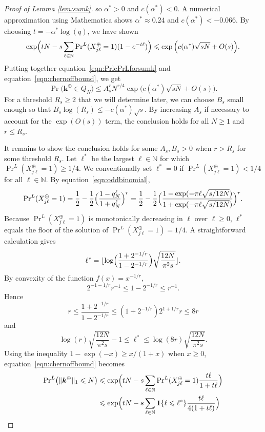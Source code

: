 \documentclass[10pt,a4paper]{amsart}
\newcommand{\bsk}{\boldsymbol{k}}
\newcommand{\bsone}{\boldsymbol{1}}
\renewcommand{\geq}{\geqslant}
\renewcommand{\leq}{\leqslant}
\newcommand{\natu}{\mathbb{N}}
\begin{document}
\begin{proof}[Proof of Lemma \ref{lem:sumk}]
     so $\alpha^*>0$ and $c(\alpha^*)<0$. A numerical approximation using Mathematica shows $\alpha^*\approx 0.24$ and $c(\alpha^*)< -0.066$.
By choosing $t=-\alpha^*\log(q)$, we have shown
    $$\exp\Bigl(tN-s\sum_{\ell\in\natu}{\textstyle\Pr}^L(X^\oplus_{j\ell}=1)(1-e^{-t\ell })\Bigr)\leq \exp\Big(c(\alpha^*)\sqrt{sN}+O(s)\Big).$$
    Putting together equation~\eqref{eqn:PrlePrLforsumk} and equation~\eqref{eqn:chernoffbound}, we get
    $$\Pr\big(\bsk^\oplus\in Q_N\big)\leq A^r_sN^{r/4}\exp\Big(c(\alpha^*)\sqrt{sN}+O(s)\Big).$$
    For a threshold $R_s\geq 2$ that we will determine later, we can choose $B_s$ small enough so that $B_s \log(R_s)\leq -c(\alpha^*)\sqrt{s}$. By increasing $A_s$ if necessary to account for the $\exp(O(s))$ term, the conclusion holds for all $N\geq 1$ and $r\leq R_s$.

        It remains to show the conclusion holds for some $A_s, B_s>0$ when $r> R_s$ for some threshold $R_s$. Let $\ell^*$ be the largest $\ell\in \natu$ for which ${\textstyle\Pr}^L(X^\oplus_{j\ell}=1)\geq 1/4$. We conventionally set $\ell^*=0$ if ${\textstyle\Pr}^L(X^\oplus_{j\ell}=1)< 1/4$ for all $\ell\in\natu$. By equation~\eqref{eqn:oddbinomial},
    $${\textstyle\Pr}^L(X^\oplus_{j\ell}=1)=\frac{1}{2}-\frac{1}{2}\Bigl(\frac{1-q_N^\ell}{1+q_N^\ell}\Bigr)^r=\frac{1}{2}-\frac{1}{2}\Bigl(\frac{1-\exp(-\pi\ell\sqrt{s/12N})}{1+\exp(-\pi\ell\sqrt{s/12N})}\Bigr)^r.$$
    Because ${\textstyle\Pr}^L(X^\oplus_{j\ell}=1)$ is monotonically decreasing in $\ell$ over $\ell\geq 0$, $\ell^*$ equals the floor of the solution of ${\textstyle\Pr}^L(X^\oplus_{j\ell}=1)=1/4$. A straightforward calculation gives
    $$\ell^*=\lfloor\log\Bigl(\frac{1+2^{-1/r}}{1-2^{-1/r}}\Bigr)\sqrt{\frac{12N}{\pi^2 s}}\rfloor.$$
    By convexity of the function $f(x)=x^{-1/r}$,
    $$2^{-1-1/r}r^{-1}\leq 1-2^{-1/r}\leq r^{-1}.$$
    Hence
    $$r\leq\frac{1+2^{-1/r}}{1-2^{-1/r}}\leq (1+2^{-1/r})2^{1+1/r}r\leq 8r$$
    and
    \begin{equation}\label{eqn:lstarbound}
      \log(r)\sqrt{\frac{12N}{\pi^2 s}}-1\leq \ell^*\leq \log(8r)\sqrt{\frac{12N}{\pi^2 s}}.  
    \end{equation}
    Using the inequality $1-\exp(-x)\geq x/(1+x)$ when $x\geq 0$, equation~\eqref{eqn:chernoffbound} becomes
    \begin{align}\label{eqn:chernoffbound2}
        {\textstyle\Pr}^L\big(\Vert\bsk^\oplus\Vert_1\leq N\big)&\leq \exp\Bigl(tN-s\sum_{\ell\in\natu}{\textstyle\Pr}^L(X^\oplus_{j\ell}=1)\frac{t\ell}{1+t\ell}\Bigr)\\
    &\leq \exp\Bigl(tN-s\sum_{\ell\in \natu}\bsone\{\ell\leq\ell^*\}\frac{t\ell}{4(1+t\ell)}\Bigr)\nonumber\\

\end{align}
\end{proof}
\end{document}
